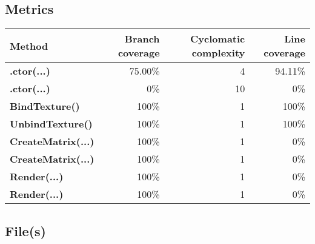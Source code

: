 \documentclass[a4paper,landscape,10pt]{article}
\begin{document}
\subsection{Metrics}
\begin{longtable}[l]{|l|r|r|r|}
\hline
\textbf{Method} & \textbf{Branch coverage} & \textbf{Cyclomatic complexity} & \textbf{Line coverage}\\
\hline
\textbf{.ctor(...)} & 75.00\% & 4 & 94.11\%\\
\hline
\textbf{.ctor(...)} & 0\% & 10 & 0\%\\
\hline
\textbf{BindTexture()} & 100\% & 1 & 100\%\\
\hline
\textbf{UnbindTexture()} & 100\% & 1 & 100\%\\
\hline
\textbf{CreateMatrix(...)} & 100\% & 1 & 0\%\\
\hline
\textbf{CreateMatrix(...)} & 100\% & 1 & 0\%\\
\hline
\textbf{Render(...)} & 100\% & 1 & 0\%\\
\hline
\textbf{Render(...)} & 100\% & 1 & 0\%\\
\hline
\end{longtable}
\subsection{File(s)}
\end{document}

